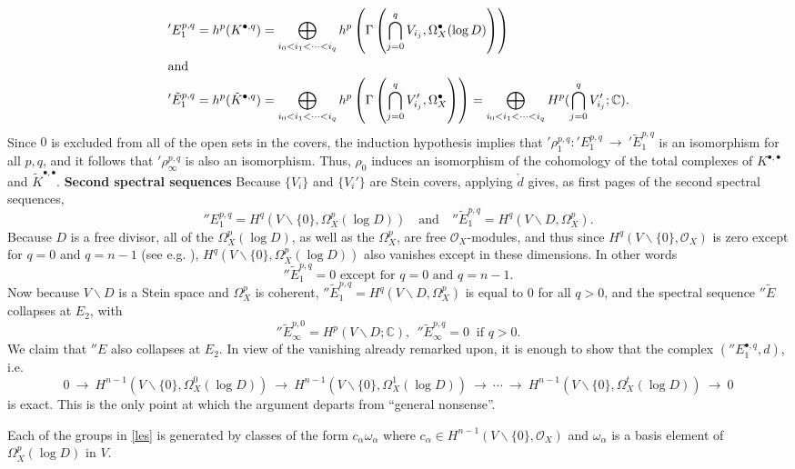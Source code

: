 \documentclass[12pt]{article}
\newcommand{\CC}{\mathbb{C}}
\newcommand{\OO}{\mathcal{O}}
\newcommand\bu{\bullet}
\newcommand\vsn{\vskip 10pt\noindent}
\newcommand\ssm{\smallsetminus}
\newcommand\beq{\begin{equation}}
\newcommand\eeq{\end{equation}}
\newcommand\tos{{\ \rightarrow\ }}
\begin{document}
\begin{align*}'E_1^{p,q}&=h^p(K^{\bu,q})=\bigoplus_{i_0<i_1<\cdots<i_q}h^p\left(\Gamma\left(\bigcap_{j=0}^qV_{i_j}, {\Omega}_X^\bu(\log D)\right)\right)
\\
\intertext{and}
'\tilde{E}_1^{p,q}&=h^p(\tilde K^{\bu,q})=\bigoplus_{i_0<i_1<\cdots<i_q}h^p\left(\Gamma\left(\bigcap_{j=0}^qV'_{i_j}, {\Omega}_X^\bu\right)\right)=
\bigoplus_{i_0<i_1<\cdots<i_q}H^p(\bigcap_{j=0}^qV'_{i_j};\CC).
\end{align*}
Since $0$ is excluded from all of the open sets in the covers, the induction hypothesis implies that $'\rho_1^{p,q}:{'E}_1^{p,q}\tos {'\tilde E}_1^{p,q}$ is an isomorphism for all $p,q$, and it follows that
$'\rho_\infty^{p,q}$ is also an isomorphism. Thus, $\rho_0$ induces an isomorphism of the cohomology of the total complexes of
$K^{\bu,\bu}$ and $\tilde K^{\bu,\bu}$.
\vsn
{\bf Second spectral sequences}
\vsn
Because $\{V_i\}$ and $\{V_i'\}$ are Stein covers, applying $\check d$ gives,  as first pages of the second spectral sequences,
$$
''E^{p,q}_1=H^q(V\ssm\{0\}, {\Omega}_X^p(\log D))\quad \text{and}\quad
''\tilde E^{p,q}_1=H^q(V\ssm D, {\Omega}_X^p).
$$
Because $D$ is a free divisor, all of the ${\Omega}_X^p(\log D)$, as well as the ${\Omega}_X^p$, are free $\OO_X$-modules, and thus since
$H^q(V\ssm\{0\},\OO_X)$ is zero except for $q=0$ and $q=n-1$ (see e.g. \cite[(8.14)]{looij}), $H^q(V\ssm\{0\},{\Omega}_X^p(\log D))$
also vanishes except in these dimensions. In other words
$$''\tilde E_1^{p,q}=0 \text{\ \ except for } q=0\text{ and }q=n-1.$$
Now because $V\ssm D$ is a Stein space and ${\Omega}_X^p$ is coherent, $''\tilde E^{p,q}_1=H^q(V\ssm D,{\Omega}_X^p)$ is equal to $0$ for all $q>0$, and the spectral sequence $''\tilde E$ collapses at $E_2$, with
\beq\label{niso''}''\tilde E_\infty^{p,0}=H^p(V\ssm D;\CC),\ \ ''\tilde E^{p,q}_\infty=0\ \text{ if }q>0.\eeq
We claim that $''E$ also collapses at $E_2$. In view of the vanishing already remarked upon, it is enough to show that the complex
$(''E_1^{\bu,q},d)$, i.e.
\beq\label{les}0\tos H^{n-1}(V\ssm\{0\},{\Omega}_X^0(\log D))\tos H^{n-1}(V\ssm\{0\},{\Omega}_X^1(\log D))\tos\cdots\tos H^{n-1}(V\ssm\{0\},{\Omega}_X^t(\log D))\tos 0\eeq is exact.
This is the only point at which the argument departs from ``general nonsense''.

Each of the groups in \eqref{les} is generated by
classes of the form $c_{\alpha}{\omega}_{\alpha}$ where $c_{\alpha}\in H^{n-1}(V\ssm\{0\},\OO_X)$ and ${\omega}_{\alpha}$ is a basis element of ${\Omega}_X^p(\log D)$ in $V$.
\end{document}
